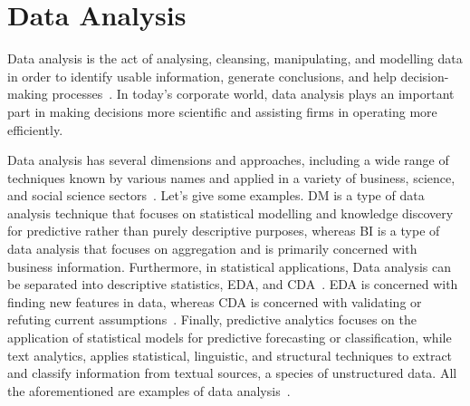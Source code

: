 \section{Data Analysis}\label{section:data_anal}
Data analysis is the act of analysing, cleansing, manipulating, and modelling data in order to identify usable information, generate conclusions, and help decision-making processes~\cite{Book:sbrown_2014_transforming}.
In today's corporate world, data analysis plays an important part in making decisions more scientific and assisting firms in operating more efficiently. 

Data analysis has several dimensions and approaches, including a wide range of techniques known by various names and applied in a variety of business, science, and social science sectors~\cite{Book:pruneau_2017}.
Let's give some examples.
\ac{DM} is a type of data analysis technique that focuses on statistical modelling and knowledge discovery for predictive rather than purely descriptive purposes,
whereas \ac{BI} is a type of data analysis that focuses on aggregation and is primarily concerned with business information.
Furthermore, in statistical applications, Data analysis can be separated into descriptive statistics, \ac{EDA}, and \ac{CDA}~\cite{Book:doing_data_science}. 
\ac{EDA} is concerned with finding new features in data, whereas \ac{CDA} is concerned with validating or refuting current assumptions~\cite{Article:intro_to_data_analysis}.
Finally, predictive analytics focuses on the application of statistical models for predictive forecasting or classification,
while text analytics, applies statistical, linguistic, and structural techniques to extract and classify information from textual sources, a species of unstructured data.
All the aforementioned are examples of data analysis~\cite{Article:goodnight_2011_the}.

